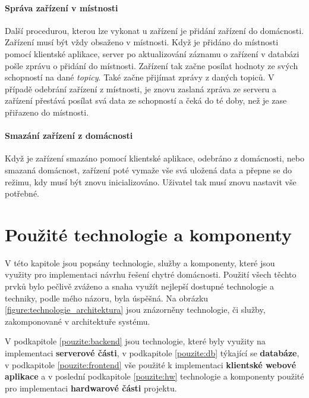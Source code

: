 \newpage
\subsubsection*{Správa zařízení v místnosti}
Další procedurou, kterou lze vykonat u zařízení je přidání zařízení do domácnosti.
Zařízení musí být vždy obsaženo v místnosti.
Když je přidáno do místnosti pomocí klientské aplikace, server po aktualizování záznamu o zařízení v databázi pošle zprávu o přidání do místnosti.
Zařízení tak začne posílat hodnoty ze svých schopností na dané \emph{topicy}. Také začne přijímat zprávy z daných topiců.
V případě odebrání zařízení z místnosti, je znovu zaslaná zpráva ze serveru a zařízení přestává posílat svá data ze schopností a čeká do té doby, než je zase přiřazeno do místnosti.
\newline

\subsubsection*{Smazání zařízení z domácnosti}
Když je zařízení smazáno pomocí klientské aplikace, odebráno z domácnosti, nebo smazaná domácnost, zařízení poté vymaže vše svá uložená data a přepne se do režimu, kdy musí být znovu inicializováno.
Uživatel tak musí znovu nastavit vše potřebné.

\newpage
\chapter{Použité technologie a komponenty}
\label{pouzite}

V této kapitole jsou popsány technologie, služby a komponenty, které jsou využity pro implementaci návrhu řešení chytré domácnosti.
Použití všech těchto prvků bylo pečlivě zváženo a snaha využít nejlepší dostupné technologie a techniky, podle mého názoru, byla úspěšná.
Na obrázku \ref{figure:technologie_architektura} jsou znázorněny technologie, či služby, zakomponované v architektuře systému.

V podkapitole \ref{pouzite:backend} jsou technologie, které byly využity na implementaci \textbf{serverové části}, v podkapitole \ref{pouzite:db} týkající se \textbf{databáze},
v podkapitole \ref{pouzite:frontend} vše použité k implementaci \textbf{klientské webové aplikace} a v poslední podkapitole \ref{pouzite:hw} technologie a komponenty použité pro implementaci \textbf{hardwarové části} projektu.

